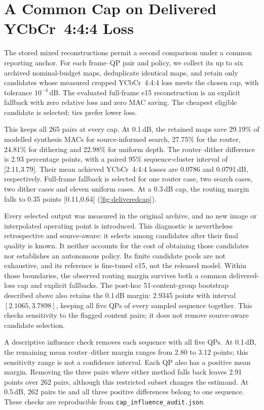 \section{A Common Cap on Delivered YCbCr~4:4:4 Loss}

The stored mixed reconstructions permit a second comparison under a common
reporting anchor. For each frame--QP pair and policy, we collect its up to
six archived nominal-budget maps, deduplicate identical maps, and retain
only candidates whose measured cropped YCbCr~4:4:4 loss meets the chosen cap,
with tolerance $10^{-4}$\,dB. The evaluated full-frame e15 reconstruction
is an explicit fallback with zero relative loss and zero MAC saving.
The cheapest eligible candidate is selected; ties prefer lower loss.

This keeps all 265 pairs at every cap. At 0.1\,dB, the retained maps save
29.19\% of modelled synthesis MACs for source-informed search, 27.75\% for
the router, 24.81\% for dithering and 22.98\% for uniform depth.
The router--dither difference is 2.93 percentage points, with a paired
95\% sequence-cluster interval of [2.11,3.79]. Their mean achieved YCbCr~4:4:4
losses are 0.0786 and 0.0791\,dB, respectively. Full-frame fallback is
selected for one router case, two search cases, two dither cases and
eleven uniform cases. At a 0.3\,dB cap, the routing margin falls to
0.35 points [0.11,0.64] (\cref{fig:deliveredcap}).

Every selected output was measured in the original archive, and no new
image or interpolated operating point is introduced. This diagnostic is
nevertheless retrospective and source-aware: it selects among candidates
after their final quality is known. It neither accounts for the cost of
obtaining those candidates nor establishes an autonomous policy. Its finite
candidate pools are not exhaustive, and its reference is fine-tuned e15,
not the released model. Within those boundaries, the observed routing
margin survives both a common delivered-loss cap and explicit fallbacks.
The post-hoc 51-content-group bootstrap described above also retains the
0.1\,dB margin: 2.9345 points with interval $[2.1065,3.7898]$, keeping all
five QPs of every sampled sequence together. This checks sensitivity to the
flagged content pairs; it does not remove source-aware candidate selection.

A descriptive influence check removes each sequence with all five QPs.
At 0.1\,dB, the remaining mean router--dither margin ranges from 2.80 to
3.12 points; this sensitivity range is not a confidence interval. Each QP
also has a positive mean margin. Removing the three pairs where either
method falls back leaves 2.91 points over 262 pairs, although this restricted
subset changes the estimand. At 0.5\,dB, 262 pairs tie and all three positive
differences belong to one sequence. These checks are reproducible from
\texttt{cap\_influence\_audit.json}.

